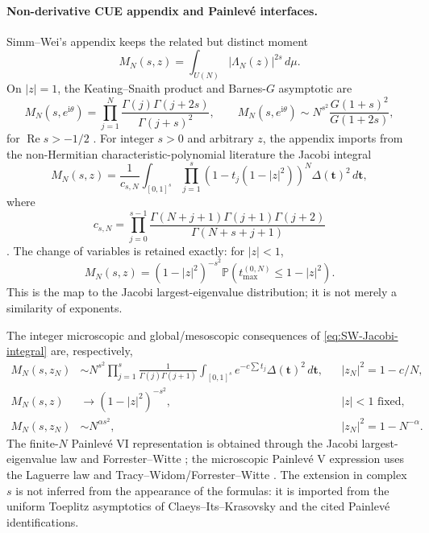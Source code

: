 \paragraph{Non-derivative CUE appendix and Painlev\'e interfaces.}
Simm--Wei's appendix keeps the related but distinct moment
\begin{equation}
 M_N(s,z)=\int_{U(N)}|\Lambda_N(z)|^{2s}\,d\mu.
 \label{eq:SW-nonderivative-moment}
\end{equation}
On $|z|=1$, the Keating--Snaith product and Barnes-$G$ asymptotic are
\begin{equation}
 M_N(s,e^{\mathrm i\theta})=
 \prod_{j=1}^{N}\frac{\Gamma(j)\Gamma(j+2s)}{\Gamma(j+s)^2},
 \qquad
 M_N(s,e^{\mathrm i\theta})\sim
 N^{s^2}\frac{G(1+s)^2}{G(1+2s)},
 \label{eq:SW-KS-product}
\end{equation}
for $\operatorname{Re}s>-1/2$ \cite{keatingSnaith2000}.  For integer $s>0$ and arbitrary
$z$, the appendix imports from the non-Hermitian characteristic-polynomial literature the
Jacobi integral
\begin{equation}
 M_N(s,z)=\frac1{c_{s,N}}\int_{[0,1]^s}
 \prod_{j=1}^{s}(1-t_j(1-|z|^2))^N\Delta(\mathbf t)^2\,d\mathbf t,
 \label{eq:SW-Jacobi-integral}
\end{equation}
where
\begin{equation}
 c_{s,N}=\prod_{j=0}^{s-1}
 \frac{\Gamma(N+j+1)\Gamma(j+1)\Gamma(j+2)}{\Gamma(N+s+j+1)}
 \label{eq:SW-Jacobi-normalization}
\end{equation}
\cite{deanoSimm2022,serebryakovSimmDubach2023}.  The change of variables is retained
exactly: for $|z|<1$,
\begin{equation}
 M_N(s,z)=(1-|z|^2)^{-s^2}
 \mathbb P\!\left(t_{\max}^{(0,N)}\leq1-|z|^2\right).
 \label{eq:SW-Jacobi-largest}
\end{equation}
This is the map to the Jacobi largest-eigenvalue distribution; it is not merely a similarity
of exponents.

The integer microscopic and global/mesoscopic consequences of
\eqref{eq:SW-Jacobi-integral} are, respectively,
\begin{align}
 M_N(s,z_N)&\sim N^{s^2}\prod_{j=1}^{s}\frac1{\Gamma(j)\Gamma(j+1)}
 \int_{[0,1]^s}e^{-c\sum t_j}\Delta(\mathbf t)^2\,d\mathbf t,
 &&|z_N|^2=1-c/N,
 \label{eq:SW-nonderivative-micro}\\
 M_N(s,z)&\longrightarrow(1-|z|^2)^{-s^2},
 &&|z|<1\text{ fixed},
 \label{eq:SW-nonderivative-global}\\
 M_N(s,z_N)&\sim N^{\alpha s^2},
 &&|z_N|^2=1-N^{-\alpha}.
 \label{eq:SW-nonderivative-meso}
\end{align}
The finite-$N$ Painlev\'e VI representation is obtained through the Jacobi largest-eigenvalue
law and Forrester--Witte \cite{forresterWitte2004}; the microscopic Painlev\'e V expression
uses the Laguerre law and Tracy--Widom/Forrester--Witte
\cite{tracyWidom1994,forresterWitte2002}.  The extension in complex $s$ is not inferred from
the appearance of the formulas: it is imported from the uniform Toeplitz asymptotics of
Claeys--Its--Krasovsky \cite{claeysItsKrasovsky2011} and the cited Painlev\'e identifications.

